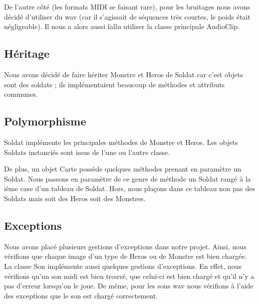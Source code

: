 \documentclass{article}
\begin{document}
  De l'autre côté (les formats MIDI se faisant rare), pour les bruitages nous avons décidé d'utiliser du wav (car il s'agissait de séquences très courtes, le poids était négligeable).
  Il nous a alors aussi fallu utiliser la classe principale AudioClip.

  \subsection{Héritage}  
  Nous avons décidé de faire hériter Monstre et Heros de Soldat car c'est objets sont des soldats ; ils implémentaient beaucoup de méthodes et attributs communes. 

  \subsection{Polymorphisme}
  Soldat implémente les principales méthodes de Monstre et Heros. 
  Les objets Soldats instanciés sont issus de l'une ou l'autre classe.
  
  De plus, un objet Carte possède quelques méthodes prenant en paramètre un Soldat. 
  Nous passons en paramètre de ce genre de méthode un Soldat rangé à la ième case d'un tableau de Soldat. 
  Hors, nous plaçons dans ce tableau non pas des Soldats mais soit des Heros soit des Monstres.

  \subsection{Exceptions}
  Nous avons placé plusieurs gestions d'exceptions dans notre projet.
  Ainsi, nous vérifions que chaque image d'un type de Heros ou de Monstre est bien chargée. 
  La classe Son implémente aussi quelques gestions d'exceptions. 
  En effet, nous vérifions qu'un son midi est bien trouvé, que celui-ci est bien chargé et qu'il n'y a pas d'erreur lorsqu'on le joue.
  De même, pour les sons wav nous vérifions à l'aide des exceptions que le son est chargé correctement.
\end{document}
